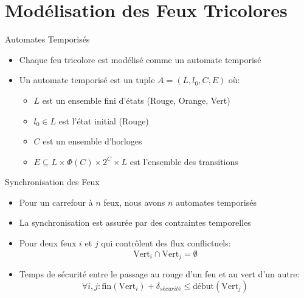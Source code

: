 \documentclass{beamer}
\begin{document}
\section{Modélisation des Feux Tricolores}

\begin{frame}{Automates Temporisés}
\begin{itemize}
    \item Chaque feu tricolore est modélisé comme un automate temporisé
    \item Un automate temporisé est un tuple $A = (L, l_0, C, E)$ où:
    \begin{itemize}
        \item $L$ est un ensemble fini d'états (Rouge, Orange, Vert)
        \item $l_0 \in L$ est l'état initial (Rouge)
        \item $C$ est un ensemble d'horloges
        \item $E \subseteq L \times \Phi(C) \times 2^C \times L$ est l'ensemble des transitions
    \end{itemize}
\end{itemize}

\begin{center}
\end{center}
\end{frame}

\begin{frame}{Synchronisation des Feux}
\begin{itemize}
    \item Pour un carrefour à $n$ feux, nous avons $n$ automates temporisés
    \item La synchronisation est assurée par des contraintes temporelles
    \item Pour deux feux $i$ et $j$ qui contrôlent des flux conflictuels:
    \begin{equation}
    \text{Vert}_i \cap \text{Vert}_j = \emptyset
    \end{equation}
    \item Temps de sécurité entre le passage au rouge d'un feu et au vert d'un autre:
    \begin{equation}
    \forall i,j: \text{fin}(\text{Vert}_i) + \delta_{sécurité} \leq \text{début}(\text{Vert}_j)
    \end{equation}
\end{itemize}
\end{frame}
\end{document}
